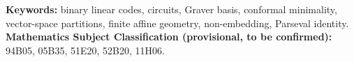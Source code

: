 \documentclass[11pt]{article}
\theoremstyle{definition}
\theoremstyle{remark}
\begin{document}
\medskip\noindent\textbf{Keywords:} binary linear codes, circuits, Graver basis, conformal minimality, vector-space partitions, finite affine geometry, non-embedding, Parseval identity.\\
\textbf{Mathematics Subject Classification (provisional, to be confirmed):} 94B05, 05B35, 51E20, 52B20, 11H06.

\tableofcontents
\clearpage







\appendix


\end{document}
